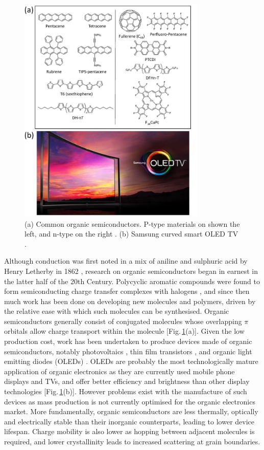 \begin{figure}[h!]
\centering
\includegraphics[width=0.8\textwidth]{Fig2}
\caption{(a) Common organic semiconductors. P-type materials on shown the left, and n-type on the right \cite{Miozzo2010}. (b) Samsung curved smart OLED TV \cite{Samsung}.}
\label{1Fig2}
\end{figure}
Although conduction was first noted in a mix of aniline and sulphuric acid by Henry Letherby in 1862 \cite{Letheby}, research on organic semiconductors began in earnest in the latter half of the 20th Century. Polycyclic aromatic compounds were found to form semiconducting charge transfer complexes with halogens \cite{Naarmann2002}, and since then much work has been done on developing new molecules and polymers, driven by the relative ease with which such molecules can be synthesised. Organic semiconductors generally consist of conjugated molecules whose overlapping $\pi$ orbitals allow charge transport within the molecule [Fig.\,\ref{1Fig2}(a)]. Given the low production cost, work has been undertaken to produce devices made of organic semiconductors, notably photovoltaics \cite{Halls1996, Chiu2012, Li2006}, thin film transistors \cite{Klauk2010, Fukuda2014, Yuan2014}, and organic light emitting diodes (OLEDs) \cite{Tang1987, Burroughes1990, Hebner1998}. OLEDs are probably the most technologically mature application of organic electronics as they are currently used mobile phone displays and TVs, and offer better efficiency and brightness than other display technologies [Fig.\,\ref{1Fig2}(b)]. However problems exist with the manufacture of such devices as mass production is not currently optimised for the organic electronics market. More fundamentally, organic semiconductors are less thermally, optically and electrically stable than their inorganic counterparts, leading to lower device lifespan. Charge mobility is also lower as hopping between adjacent molecules is required, and lower crystallinity leads to increased scattering at grain boundaries. 

